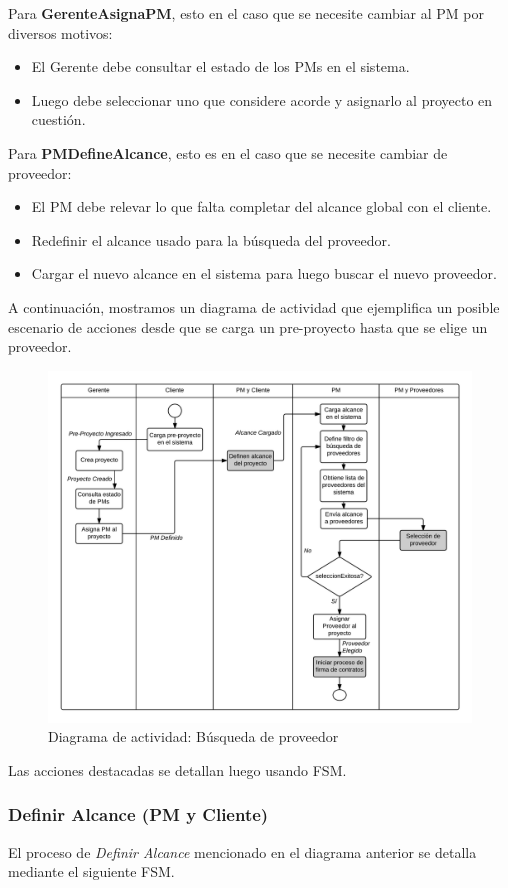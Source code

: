 Para \textbf{GerenteAsignaPM}, esto en el caso que se necesite cambiar al PM 
por diversos motivos:
\begin{itemize}
	\item El Gerente debe consultar el estado de los PMs en el sistema. 
	\item Luego debe seleccionar uno que considere acorde y asignarlo al proyecto 
	en cuestión. 
\end{itemize}

Para \textbf{PMDefineAlcance}, esto es en el caso que se necesite cambiar de proveedor:
\begin{itemize}
	\item El PM debe relevar lo que falta completar del alcance global 
	con el cliente. 
	\item Redefinir el alcance usado para la búsqueda del proveedor. 
	\item Cargar el nuevo alcance en el sistema para luego buscar el nuevo proveedor. 
\end{itemize}

A continuación, mostramos un diagrama de actividad que ejemplifica un posible 
escenario de acciones desde que se carga un pre-proyecto hasta que se elige un 
proveedor. 

\begin{figure}[H]
\centering
\includegraphics[width=0.8\linewidth]{diag/nuevos/act-busqprov.png}
\caption{Diagrama de actividad: Búsqueda de proveedor}
\label{act-busqprov}
\end{figure}

Las acciones destacadas se detallan luego usando FSM. 


	\subsubsection{Definir Alcance (PM y Cliente)}
El proceso de \textit{Definir Alcance} mencionado en el diagrama anterior 
se detalla mediante el siguiente FSM. 

